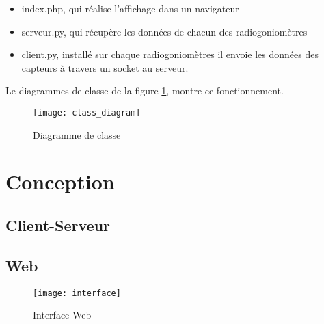 \begin{itemize}
\item index.php, qui réalise l'affichage dans un navigateur
\item serveur.py, qui récupère les données de chacun des radiogoniomètres
\item client.py, installé sur chaque radiogoniomètres il envoie les données des capteurs à travers un socket au serveur.
\end{itemize}

Le diagrammes de classe de la figure \ref{fig:class}, montre ce fonctionnement.

\begin{figure}[!h]
  \centering
  \texttt{[image: class\_diagram]}
  \caption{Diagramme de classe}
  \label{fig:class}
\end{figure}



\section{Conception}

\subsection{Client-Serveur}


\subsection{Web}



\begin{figure}[!h]
  \centering
  \texttt{[image: interface]}
  \caption{Interface Web}
  \label{fig:interface}
\end{figure}


